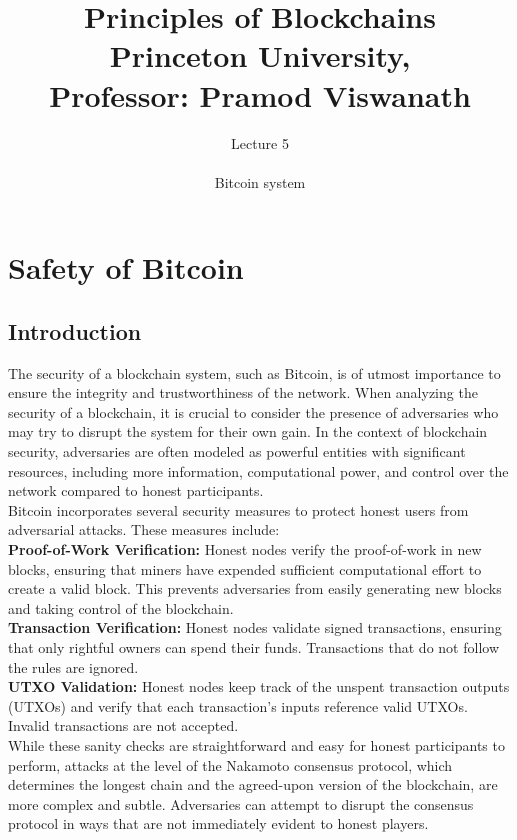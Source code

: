 \documentclass{report}
\title{\Huge{Principles of Blockchains \\ Princeton University,\\
		Professor: Pramod Viswanath}}
\author{\huge{Lecture 5} \\\\ Bitcoin system}
\begin{document}
\maketitle
\newpage%
\tableofcontents
\pagebreak

\chapter{Safety of Bitcoin}

\section{Introduction}

The security of a blockchain system, such as Bitcoin, is of utmost importance to ensure the integrity and trustworthiness of the network. When analyzing the security of a blockchain, it is crucial to consider the presence of adversaries who may try to disrupt the system for their own gain. In the context of blockchain security, adversaries are often modeled as powerful entities with significant resources, including more information, computational power, and control over the network compared to honest participants.\\
Bitcoin incorporates several security measures to protect honest users from adversarial attacks. These measures include:\\
\textbf{Proof-of-Work Verification:} Honest nodes verify the proof-of-work in new blocks, ensuring that miners have expended sufficient computational effort to create a valid block. This prevents adversaries from easily generating new blocks and taking control of the blockchain.\\
\textbf{Transaction Verification:} Honest nodes validate signed transactions, ensuring that only rightful owners can spend their funds. Transactions that do not follow the rules are ignored.\\
\textbf{UTXO Validation:} Honest nodes keep track of the unspent transaction outputs (UTXOs) and verify that each transaction's inputs reference valid UTXOs. Invalid transactions are not accepted.\\
While these sanity checks are straightforward and easy for honest participants to perform, attacks at the level of the Nakamoto consensus protocol, which determines the longest chain and the agreed-upon version of the blockchain, are more complex and subtle. Adversaries can attempt to disrupt the consensus protocol in ways that are not immediately evident to honest players.\\
\end{document}
